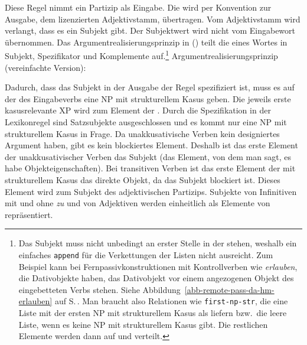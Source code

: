 {\noindent
Diese Regel nimmt ein Partizip als Eingabe. Die \argstl wird per Konvention zur Ausgabe, dem
lizenzierten Adjektivstamm, übertragen. Vom Adjektivstamm wird verlangt, dass es ein Subjekt
gibt. Der Subjektwert wird nicht vom Eingabewort übernommen. Das
Argumentrealisierungsprinzip in () teilt die \argstl eines Wortes in Subjekt, Spezifikator und Komplemente
auf.\footnote{%
Das Subjekt muss nicht unbedingt an erster Stelle in der \argstl stehen, weshalb ein einfaches
\texttt{append} für die Verkettungen der Listen nicht ausreicht. Zum Beispiel kann bei
Fernpassivkonstruktionen mit Kontrollverben wie \emph{erlauben}, die Dativobjekte haben, das
Dativobjekt vor einem angezogenen Objekt des eingebetteten Verbs stehen. Siehe
Abbildung~\ref{abb-remote-pass-da-hm-erlauben} auf S.\,\pageref{abb-remote-pass-da-hm-erlauben}. Man
braucht also Relationen wie \texttt{first-np-str}, die eine Liste mit der ersten NP mit
strukturellem Kasus als \subjw liefern bzw.\ die leere Liste, wenn es keine NP mit strukturellem
Kasus gibt. Die restlichen Elemente werden dann auf \spr und \comps verteilt.
}
\ea
\label{Prinzip-Argumentrealisierung-einfach-SUBJ-zwei}%
Argumentrealisierungsprinzip (vereinfachte Version):\\[2pt]
 \impl
{}
\z

\noindent
Dadurch, dass das Subjekt in der Ausgabe der Regel spezifiziert ist, muss es auf der \argstl
des Eingabeverbs eine NP mit strukturellem Kasus geben. Die jeweils erste kasusrelevante XP 
wird zum Element der \subjl. Durch die Spezifikation in der Lexikonregel sind Satzsubjekte
ausgeschlossen und es kommt nur eine NP mit strukturellem Kasus in Frage.
Da unakkusativische Verben kein designiertes
Argument haben, gibt es kein blockiertes Element. Deshalb ist das erste
Element der \argstl unakkusativischer Verben das Subjekt (das Element, von dem
man sagt, es habe Objekteigenschaften). Bei transitiven Verben ist das
erste Element der \argstl mit strukturellem Kasus das direkte Objekt, da das Subjekt
blockiert ist. Dieses Element wird zum Subjekt des adjektivischen Partizips.
Subjekte von Infinitiven mit und ohne \emph{zu} und von Adjektiven werden
einheitlich als Elemente von \subj repräsentiert. 

}
